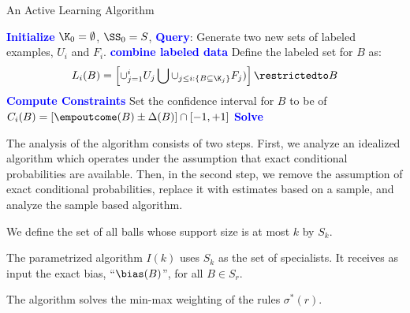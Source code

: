 \pagebreak
\begin{algorithm}[]
   \caption{An Active Learning Algorithm}
   \label{alg:activealg}
\begin{algorithmic}
   \STATE \textbf{\textcolor{blue}{Initialize}}   $\K_0=\emptyset$, $\SS_0 = S$,
   \STATE \textbf{\textcolor{blue}{Query}}: Generate two new sets of labeled examples, $U_i$ and $F_i$. 
   \ELSE
   \ENDIF
   \STATE \textbf{\textcolor{blue}{combine labeled data}}
   \STATE Define the labeled set for $B$ as:
   $$ L_i(B) = \left[ \cup_{j=1}^i U_j \bigcup \cup_{j \leq i: \{B \subseteq \K_j\}} F_j)\right] \restrictedto B$$
   \ENDFOR
   \STATE \textbf{\textcolor{blue}{Compute Constraints}}
   \STATE Set the confidence interval for $B$ to be 
   of $C_i(B)=[\empoutcome(B) \pm \Delta(B)] \cap [-1,+1]$ 
   \ENDFOR
   \STATE \textbf{\textcolor{blue}{Solve}}
     
   \ENDFOR
\end{algorithmic}
\end{algorithm}

The analysis of the algorithm consists of two steps.
First, we analyze an idealized algorithm
which operates under the assumption that exact conditional
probabilities are available. Then, in the second step, we remove the
assumption of exact conditional probabilities, replace it with
estimates based on a sample, and analyze the sample based algorithm.

We define the set of all balls whose support size is at most $k$ by $S_k$.

The parametrized algorithm $I(k)$ uses $S_k$ as the set of specialists. 
It receives as input the exact bias, ``$\bias(B)$'', for all $B \in S_r$.

The algorithm solves the min-max weighting of the rules $\sigma^*(r)$.

